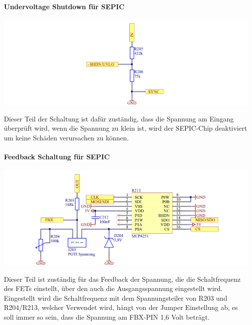 \documentclass[paper=a4, 12pt]{scrreprt}
\begin{document}
			\paragraph{Undervoltage Shutdown für SEPIC}\hfill \break
			\begin{adjustbox}{center,caption={Undervoltage Shutdown Schaltung für LT3757},label={fig:uvlo},nofloat=figure,vspace=\bigskipamount}
				\includegraphics[width=\textwidth]{img/Undervolteage_Shutdown_SEPIC.PNG}
			\end{adjustbox}
			Dieser Teil der Schaltung ist dafür zuständig, dass die Spannung am Eingang überprüft wird, wenn die Spannung zu klein ist, wird der SEPIC-Chip deaktiviert um keine Schäden verursachen zu können.
			\pagebreak
			\paragraph{Feedback Schaltung für SEPIC}\hfill \break
			\begin{adjustbox}{center,caption={Feedback Schaltung für SEPIC},label={fig:feedback},nofloat=figure,vspace=\bigskipamount}
				\includegraphics[width=\textwidth]{img/Feedback_SEPIC.PNG}
			\end{adjustbox}
			Dieser Teil ist zuständig für das Feedback der Spannung, die die Schaltfrequenz des FETs einstellt, über den auch die Ausgangsspannung eingestellt wird. Eingestellt wird die Schaltfrequenz mit dem Spannungsteiler von R203 und R204/R213, welcher Verwendet wird, hängt von der Jumper Einstellung ab, es soll immer so sein, dass die Spannung am FBX-PIN 1,6 Volt beträgt.
			
\end{document}
